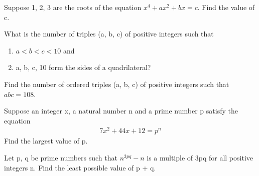 \item Suppose 1, 2, 3 are the roots of the equation $x^4 + ax^2 + bx = c$. Find the value of c.

\item What is the number of triples (a, b, c) of positive integers such that
\begin{enumerate}
\item $a < b < c < 10$ and
\item  a, b, c, 10 form the sides of a quadrilateral?
\end{enumerate}

\item  Find the number of ordered triples (a, b, c) of positive integers such that $abc = 108$.

\item  Suppose an integer x, a natural number n and a prime number p satisfy the equation 
\begin{align*}
7x^{2} + 44x + 12 = p^{n}
\end{align*} 
Find the largest value of p. 

\item Let p, q be prime numbers such that $n^{3pq} - n$ is a multiple of 3pq for all positive integers n. Find the least possible value of p + q.
